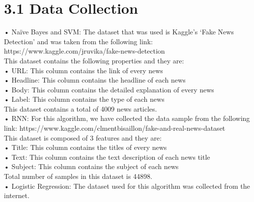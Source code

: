 \documentclass[12pt]{article}
\begin{document}
\section*{3.1 Data Collection}
•	Naïve Bayes and SVM: The dataset that was used is Kaggle’s ‘Fake News Detection’ and was taken from the following link: https://www.kaggle.com/jruvika/fake-news-detection\\
This dataset contains the following properties and they are:\\
•	URL: This column contains the link of every news\\
•	Headline: This column contains the headline of each news\\
•	Body: This column contains the detailed explanation of every news\\
•	Label: This column contains the type of each news\\
This dataset contains a total of 4009 news articles.\\
•	RNN: For this algorithm, we have collected the data sample from the following link: https://www.kaggle.com/clmentbisaillon/fake-and-real-news-dataset\\
This dataset is composed of 3 features and they are:\\
•	Title: This column contains the titles of every news\\
•	Text: This column contains the text description of each news title\\
•	Subject: This column contains the subject of each news\\
Total number of samples in this dataset is 44898.\\
•	Logistic Regression: The dataset used for this algorithm was collected from the internet.
\end{document}
